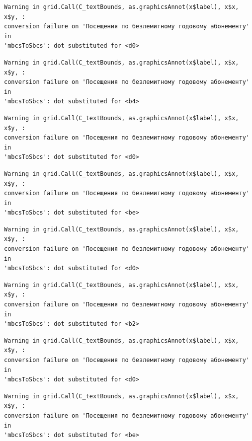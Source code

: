 \documentclass[
  letterpaper,
  DIV=11,
  numbers=noendperiod]{scrartcl}
\begin{document}
\begin{verbatim}
Warning in grid.Call(C_textBounds, as.graphicsAnnot(x$label), x$x, x$y, :
conversion failure on 'Посещения по безлемитному годовому абонементу' in
'mbcsToSbcs': dot substituted for <d0>
\end{verbatim}

\begin{verbatim}
Warning in grid.Call(C_textBounds, as.graphicsAnnot(x$label), x$x, x$y, :
conversion failure on 'Посещения по безлемитному годовому абонементу' in
'mbcsToSbcs': dot substituted for <b4>
\end{verbatim}

\begin{verbatim}
Warning in grid.Call(C_textBounds, as.graphicsAnnot(x$label), x$x, x$y, :
conversion failure on 'Посещения по безлемитному годовому абонементу' in
'mbcsToSbcs': dot substituted for <d0>
\end{verbatim}

\begin{verbatim}
Warning in grid.Call(C_textBounds, as.graphicsAnnot(x$label), x$x, x$y, :
conversion failure on 'Посещения по безлемитному годовому абонементу' in
'mbcsToSbcs': dot substituted for <be>
\end{verbatim}

\begin{verbatim}
Warning in grid.Call(C_textBounds, as.graphicsAnnot(x$label), x$x, x$y, :
conversion failure on 'Посещения по безлемитному годовому абонементу' in
'mbcsToSbcs': dot substituted for <d0>
\end{verbatim}

\begin{verbatim}
Warning in grid.Call(C_textBounds, as.graphicsAnnot(x$label), x$x, x$y, :
conversion failure on 'Посещения по безлемитному годовому абонементу' in
'mbcsToSbcs': dot substituted for <b2>
\end{verbatim}

\begin{verbatim}
Warning in grid.Call(C_textBounds, as.graphicsAnnot(x$label), x$x, x$y, :
conversion failure on 'Посещения по безлемитному годовому абонементу' in
'mbcsToSbcs': dot substituted for <d0>
\end{verbatim}

\begin{verbatim}
Warning in grid.Call(C_textBounds, as.graphicsAnnot(x$label), x$x, x$y, :
conversion failure on 'Посещения по безлемитному годовому абонементу' in
'mbcsToSbcs': dot substituted for <be>
\end{verbatim}
\end{document}
